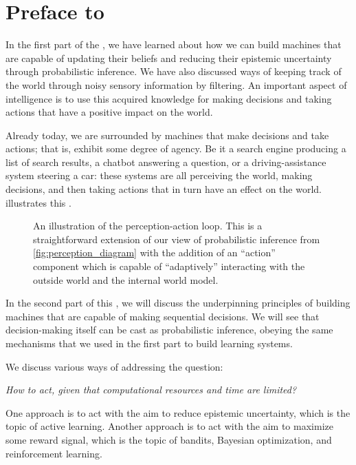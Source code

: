 \chapter*{Preface to }

In the first part of the \course, we have learned about how we can build machines that are capable of updating their beliefs and reducing their epistemic uncertainty through probabilistic inference.
We have also discussed ways of keeping track of the world through noisy sensory information by filtering.
An important aspect of intelligence is to use this acquired knowledge for making decisions and taking actions that have a positive impact on the world.

Already today, we are surrounded by machines that make decisions and take actions; that is, exhibit some degree of agency.
Be it a search engine producing a list of search results, a chatbot answering a question, or a driving-assistance system steering a car: these systems are all perceiving the world, making decisions, and then taking actions that in turn have an effect on the world.
 illustrates this .

\begin{figure}
	\caption{An illustration of the perception-action loop. This is a straightforward extension of our view of probabilistic inference from \cref{fig:perception_diagram} with the addition of an ``action'' component which is capable of ``adaptively'' interacting with the outside world and the internal world model.}
  \label{fig:preception_action_loop}
\end{figure}

In the second part of this \course, we will discuss the underpinning principles of building machines that are capable of making sequential decisions.
We will see that decision-making itself can be cast as probabilistic inference, obeying the same mechanisms that we used in the first part to build learning systems.

We discuss various ways of addressing the question: \begin{center}
  \emph{How to act, given that computational resources and time are limited?}
\end{center}
One approach is to act with the aim to reduce epistemic uncertainty, which is the topic of active learning.
Another approach is to act with the aim to maximize some reward signal, which is the topic of bandits, Bayesian optimization, and reinforcement learning.

